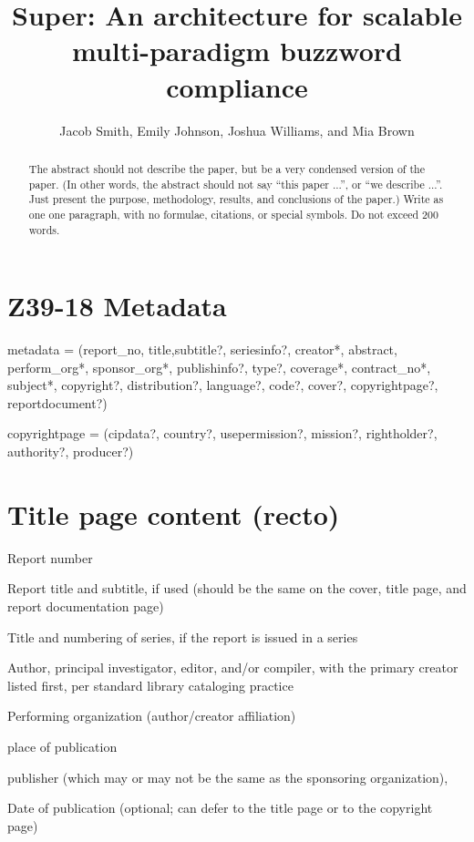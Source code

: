 \documentclass{article}
\begin{document}
%
\title{Super: An architecture for scalable multi-paradigm buzzword compliance}
\author{Jacob Smith, Emily Johnson, Joshua Williams, and Mia Brown}
\maketitle

\begin{abstract}
The abstract should not describe the paper, but
be a very condensed version of the paper.  (In other words, the abstract
should not say ``this paper ...'', or ``we describe ...''.  Just present the
purpose, methodology, results, and conclusions of the paper.)  Write as one
one paragraph, with no formulae, citations, or special symbols.  Do not
exceed 200 words.
\end{abstract}


\section{Z39-18 Metadata}

metadata = (report\_no, title,subtitle?, seriesinfo?, creator*, abstract, perform\_org*, sponsor\_org*, publishinfo?, type?, coverage*, contract\_no*, subject*, copyright?, distribution?, language?, code?, cover?, copyrightpage?, reportdocument?)

copyrightpage = (cipdata?, country?, usepermission?, mission?, rightholder?, authority?, producer?)


\section{Title page content (recto)}
Report number

Report title and subtitle, if used (should be the same on the cover,
  title page, and report documentation page)

Title and numbering of series, if the report is issued in a series

Author, principal investigator, editor, and/or compiler, with the
  primary creator listed first, per standard library cataloging practice

Performing organization (author/creator affiliation)

place of publication

publisher (which may or may not be the same as the sponsoring
  organization),

Date of publication (optional; can defer to the title page or to the
  copyright page)
\end{document}
